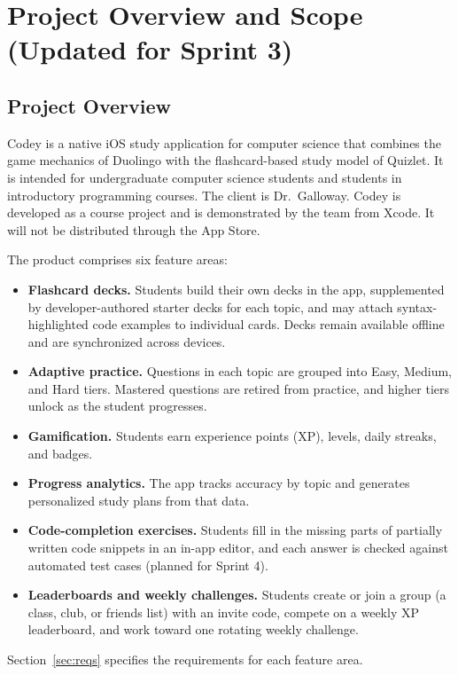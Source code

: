 \documentclass[12pt,letterpaper]{article}
\begin{document}
\section{Project Overview and Scope (Updated for Sprint 3)}

\subsection{Project Overview}
Codey is a native iOS study application for computer science that combines the game
mechanics of Duolingo with the flashcard-based study model of Quizlet. It is intended
for undergraduate computer science students and students in introductory programming
courses. The client is Dr.\ Galloway. Codey is developed as a course project and is
demonstrated by the team from Xcode. It will not be distributed through the App Store.

The product comprises six feature areas:
\begin{itemize}
  \item \textbf{Flashcard decks.} Students build their own decks in the app, supplemented by developer-authored starter
        decks for each topic, and may attach
        syntax-highlighted code examples to individual cards. Decks remain available
        offline and are synchronized across devices.
  \item \textbf{Adaptive practice.} Questions in each topic are grouped into Easy,
        Medium, and Hard tiers. Mastered questions are retired from practice, and
        higher tiers unlock as the student progresses.
  \item \textbf{Gamification.} Students earn experience points (XP), levels, daily
        streaks, and badges.
  \item \textbf{Progress analytics.} The app tracks accuracy by topic and generates
        personalized study plans from that data.
  \item \textbf{Code-completion exercises.} Students fill in the missing parts of
        partially written code snippets in an in-app editor, and each answer is checked
        against automated test cases (planned for Sprint 4).
  \item \textbf{Leaderboards and weekly challenges.} Students create or join a group
        (a class, club, or friends list) with an invite code, compete on a weekly XP
        leaderboard, and work toward one rotating weekly challenge.
\end{itemize}
Section~\ref{sec:reqs} specifies the requirements for each feature area.
\end{document}
